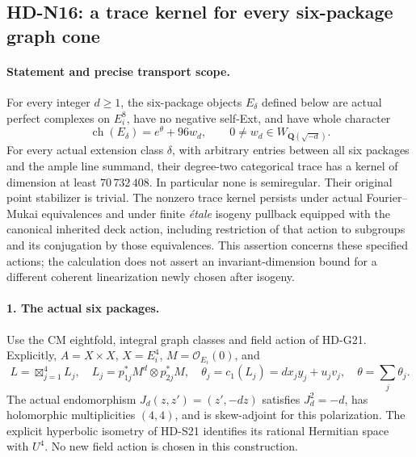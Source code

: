 \subsection{HD-N16: a trace kernel for every six-package graph cone}
\label{sec:HD-N16}

\paragraph{Statement and precise transport scope.}
For every integer $d\geq1$, the six-package objects $E_\delta$ defined
below are actual perfect complexes on $E_i^8$, have no negative
self-Ext, and have whole character
\[
             \operatorname{ch}(E_\delta)=e^\theta+96w_d,
                 \qquad 0\ne w_d\in W_{\mathbf Q(\sqrt{-d})}.
\]
For every actual extension class $\delta$, with arbitrary entries
between all six packages and the ample line summand, their degree-two
categorical trace has a kernel of dimension at least
$70\,732\,408$. In particular none is semiregular. Their original
point stabilizer is trivial. The nonzero trace kernel persists under
actual Fourier--Mukai equivalences and under finite \emph{\'etale}
isogeny pullback equipped with the canonical inherited deck action,
including restriction of that action to subgroups and its conjugation
by those equivalences. This assertion concerns these specified
actions; the calculation does not assert an invariant-dimension bound
for a different coherent linearization newly chosen after isogeny.

\paragraph{1. The actual six packages.}
Use the CM eightfold, integral graph classes and field action of
HD-G21. Explicitly, $A=X\times X$, $X=E_i^4$, $M=\mathcal O_{E_i}(0)$,
and
\[
 L=\boxtimes_{j=1}^4 L_j,\quad
 L_j=p_{1j}^*M^d\otimes p_{2j}^*M,\quad
 \theta_j=c_1(L_j)=d x_jy_j+u_jv_j,\quad \theta=\sum_j\theta_j.
\]
The actual endomorphism $J_d(z,z')=(z',-dz)$ satisfies
$J_d^2=-d$, has holomorphic multiplicities $(4,4)$, and is
skew-adjoint for this polarization. The explicit hyperbolic
isometry of HD-S21 identifies its rational Hermitian space with
$U^4$. No new field action is chosen in this construction.

